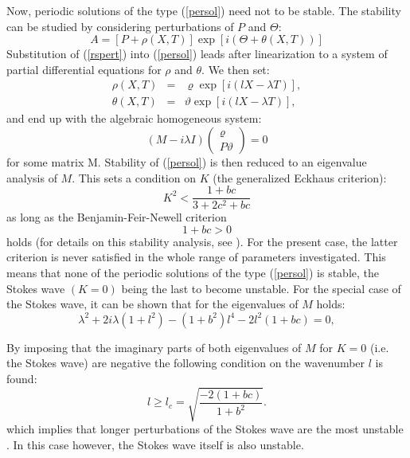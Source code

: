 \documentclass[12pt,a4paper,twocolumn,fleqn]{narms}
\begin{document}
Now, periodic solutions of the type (\ref{persol}) need not to be
stable. The stability can be studied by considering perturbations
of $P$ and $\Theta$:
\begin{equation}
A=[ P+\rho(X,T)] \exp [ i (\Theta+\theta(X,T))]
\label{rspert}
\end{equation}
Substitution of (\ref{rspert}) into (\ref{persol}) leads after
linearization to a system of partial differential equations for
$\rho$ and $\theta$. We then set:
\begin{eqnarray}
\rho(X,T)&=& \varrho \exp [ i (l X - \lambda T) ], \\
\theta(X,T)&=& \vartheta \exp [ i (l X - \lambda T) ],
\end{eqnarray}
and end up with the algebraic homogeneous system:
\begin{equation}
(M- i \lambda I)
\left(
\begin{array}{c}
\varrho \\ P \vartheta
\end{array}
\right)
= 0
\end{equation}
for some matrix M.
Stability of (\ref{persol}) is then reduced to an eigenvalue analysis of $M$.
This sets a condition on $K$ (the generalized Eckhaus criterion):
\begin{equation}
K^2 < \frac{1+bc}{3+2c^2+bc}
\end{equation}
as long as the Benjamin-Feir-Newell criterion
\begin{equation}
1+bc > 0
\label{bfn}
\end{equation}
holds (for details on this stability analysis, see ). For the present case, the latter criterion is never satisfied
in the whole range of parameters investigated. This means that none of
the periodic solutions of the type (\ref{persol}) is stable, the
Stokes wave $(K=0)$ being the last to become unstable.
For the special case of the Stokes wave, it can be shown that for the eigenvalues of $M$ holds:
\begin{equation}
\lambda^2 + 2 i \lambda (1 + l^2) - (1 + b^2)l^4
- 2  l^2 (1 + bc)  = 0,
\end{equation}

By imposing that the imaginary parts of both eigenvalues of $M$ for $K=0$ (i.e. the Stokes wave) are negative the
following condition on the wavenumber $l$ is found:
\begin{equation}
l\geq l_c = \sqrt{\frac{-2(1+bc)}{1+b^2}}.
\end{equation}
which implies that longer perturbations of the Stokes wave are the
most unstable \cite{sd78}.
In this case however, the Stokes wave itself is also unstable.
\end{document}
